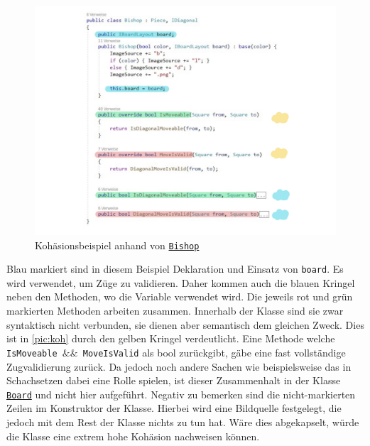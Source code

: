 \documentclass[
10pt, %
a4paper, %
oneside, %
headinclude,footinclude, %
BCOR5mm, %
]{scrartcl}
\begin{document}
\begin{onehalfspace}
\begin{figure}[h]
	\begin{center}
		\includegraphics[width=\textwidth]{Kohaesion.pdf}
		\caption{\label{pic:koh} Kohäsionsbeispiel anhand von \texttt{\href{https://github.com/schmida736/Chess-AdvancedSE/blob/main/Chess-AdvancedSE/Game\%20Elements/Pieces/Bishop.cs}{Bishop}}}
	\end{center}
\end{figure}

Blau markiert sind in diesem Beispiel Deklaration und Einsatz von \texttt{board}. Es wird verwendet, um Züge zu validieren. Daher kommen auch die blauen Kringel neben den Methoden, wo die Variable verwendet wird. Die jeweils rot und grün markierten Methoden arbeiten zusammen. Innerhalb der Klasse sind sie zwar syntaktisch nicht verbunden, sie dienen aber semantisch dem gleichen Zweck. Dies ist in \autoref{pic:koh} durch den gelben Kringel verdeutlicht. Eine Methode welche \texttt{IsMoveable $\&\&$ MoveIsValid} als bool zurückgibt, gäbe eine fast vollständige Zugvalidierung zurück. Da jedoch noch andere Sachen wie beispielsweise das in Schachsetzen dabei eine Rolle spielen, ist dieser Zusammenhalt in der Klasse \texttt{\href{https://github.com/schmida736/Chess-AdvancedSE/blob/main/Chess-AdvancedSE/Game\%20Elements/Board.cs}{Board}} und nicht hier aufgeführt. 
Negativ zu bemerken sind die nicht-markierten Zeilen im Konstruktor der Klasse. Hierbei wird eine Bildquelle festgelegt, die jedoch mit dem Rest der Klasse nichts zu tun hat. Wäre dies abgekapselt, würde die Klasse eine extrem hohe Kohäsion nachweisen können.





\end{onehalfspace}
\end{document}
